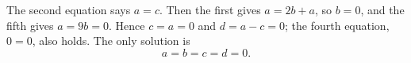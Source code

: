 The second equation says $a=c$. Then the first gives $a=2b+a$, so $b=0$, and the fifth gives $a=9b=0$. Hence $c=a=0$ and $d=a-c=0$; the fourth equation, $0=0$, also holds. The only solution is
\[\boxed{a=b=c=d=0}.\]
